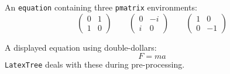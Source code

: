 
\bigskip
An {\tt equation} containing three {\tt pmatrix} environments:
\begin{equation}
\begin{pmatrix}0 & 1 \\ 1 & 0\end{pmatrix}
\qquad
\begin{pmatrix}0 & -i \\ i & 0\end{pmatrix}
\qquad
\begin{pmatrix}1 & 0 \\ 0 & -1\end{pmatrix}
\end{equation}

A displayed equation using double-dollars:
$$
F = ma
$$
{\tt LatexTree} deals with these during pre-processing.
\endinput

